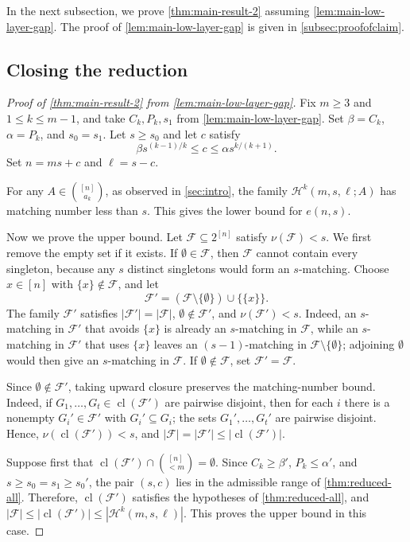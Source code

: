 \documentclass[10pt,a4paper]{article}
\numberwithin{equation}{section}
\theoremstyle{definition}
\newcommand{\F}{\mathcal F}
\newcommand{\cl}{\operatorname{cl}}
\begin{document}
In the next subsection, we prove \cref{thm:main-result-2} assuming \cref{lem:main-low-layer-gap}.
The proof of \cref{lem:main-low-layer-gap} is given in \cref{subsec:proofofclaim}.

\subsection{Closing the reduction}\label{subsec:close}

\begin{proof}[Proof of \cref{thm:main-result-2} from \cref{lem:main-low-layer-gap}]
        Fix $m\ge3$ and $1\le k\le m-1$, and take $C_k,P_k,s_1$ from \cref{lem:main-low-layer-gap}.
        Set $\beta=C_k$, $\alpha=P_k$, and $s_0=s_1$.
        Let $s\ge s_0$ and let $c$ satisfy
        \[
                \beta s^{(k-1)/k}\le c\le \alpha s^{k/(k+1)}.
        \]
        Set $n=ms+c$ and $\ell=s-c$.

        For any $A\in\binom{[n]}{a_k}$, as observed in \cref{sec:intro},
        the family $\mathcal H^k(m,s,\ell;A)$ has matching number less than $s$.
        This gives the lower bound for $e(n,s)$.

        Now we prove the upper bound.
        Let $\F\subseteq2^{[n]}$ satisfy $\nu(\F)<s$.
        We first remove the empty set if it exists.
        If $\emptyset\in\F$, then $\F$ cannot contain every singleton, because any $s$ distinct singletons would form an $s$-matching.
        Choose $x\in[n]$ with $\{x\}\notin\F$, and let
        \[
                \F'=(\F\setminus\{\emptyset\})\cup\{\{x\}\}.
        \]
        The family $\F'$ satisfies $|\F'|=|\F|$, $\emptyset\notin\F'$, and $\nu(\F')<s$.
        Indeed, an $s$-matching in $\F'$ that avoids $\{x\}$ is already an $s$-matching in $\F$, while an $s$-matching in $\F'$ that uses $\{x\}$ leaves an $(s-1)$-matching in $\F\setminus\{\emptyset\}$; adjoining $\emptyset$ would then give an $s$-matching in $\F$.
        If $\emptyset\notin\F$, set $\F'=\F$.

        Since $\emptyset\notin\F'$, taking upward closure preserves the matching-number bound.
        Indeed, if $G_1,\ldots,G_t\in\cl(\F')$ are pairwise disjoint, then for each $i$ there is a nonempty $G_i'\in\F'$ with $G_i'\subseteq G_i$; the sets $G_1',\ldots,G_t'$ are pairwise disjoint.
        Hence, $\nu(\cl(\F'))<s$, and $|\F|=|\F'|\le |\cl(\F')|$.

        Suppose first that $\cl(\F')\cap\binom{[n]}{<m}=\emptyset$.
        Since $C_k\ge \beta'$, $P_k\le \alpha'$, and $s\ge s_0=s_1\ge s_0'$, the pair $(s,c)$ lies in the admissible range of \cref{thm:reduced-all}.
        Therefore, $\cl(\F')$ satisfies the hypotheses of \cref{thm:reduced-all}, and $|\F|\le |\cl(\F')|\le |\mathcal H^k(m,s,\ell)|$.
        This proves the upper bound in this case.


\end{proof}
\end{document}
